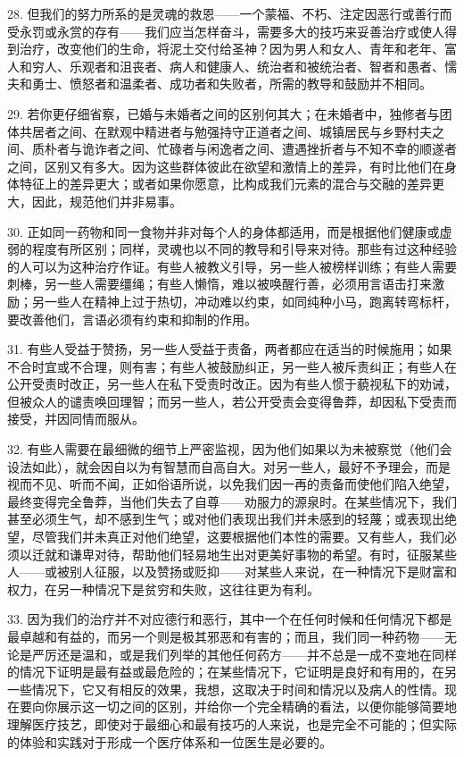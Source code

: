 28. 但我们的努力所系的是灵魂的救恩——一个蒙福、不朽、注定因恶行或善行而受永罚或永赏的存有——我们应当怎样奋斗，需要多大的技巧来妥善治疗或使人得到治疗，改变他们的生命，将泥土交付给圣神？因为男人和女人、青年和老年、富人和穷人、乐观者和沮丧者、病人和健康人、统治者和被统治者、智者和愚者、懦夫和勇士、愤怒者和温柔者、成功者和失败者，所需的教导和鼓励并不相同。\par

29. 若你更仔细省察，已婚与未婚者之间的区别何其大；在未婚者中，独修者与团体共居者之间、在默观中精进者与勉强持守正道者之间、城镇居民与乡野村夫之间、质朴者与诡诈者之间、忙碌者与闲逸者之间、遭遇挫折者与不知不幸的顺遂者之间，区别又有多大。因为这些群体彼此在欲望和激情上的差异，有时比他们在身体特征上的差异更大；或者如果你愿意，比构成我们元素的混合与交融的差异更大，因此，规范他们并非易事。\par

30. 正如同一药物和同一食物并非对每个人的身体都适用，而是根据他们健康或虚弱的程度有所区别；同样，灵魂也以不同的教导和引导来对待。那些有过这种经验的人可以为这种治疗作证。有些人被教义引导，另一些人被榜样训练；有些人需要刺棒，另一些人需要缰绳；有些人懒惰，难以被唤醒行善，必须用言语击打来激励；另一些人在精神上过于热切，冲动难以约束，如同纯种小马，跑离转弯标杆，要改善他们，言语必须有约束和抑制的作用。\par

31. 有些人受益于赞扬，另一些人受益于责备，两者都应在适当的时候施用；如果不合时宜或不合理，则有害；有些人被鼓励纠正，另一些人被斥责纠正；有些人在公开受责时改正，另一些人在私下受责时改正。因为有些人惯于藐视私下的劝诫，但被众人的谴责唤回理智；而另一些人，若公开受责会变得鲁莽，却因私下受责而接受，并因同情而服从。\par

32. 有些人需要在最细微的细节上严密监视，因为他们如果以为未被察觉（他们会设法如此），就会因自以为有智慧而自高自大。对另一些人，最好不予理会，而是视而不见、听而不闻，正如俗语所说，以免我们因一再的责备而使他们陷入绝望，最终变得完全鲁莽，当他们失去了自尊——劝服力的源泉时。在某些情况下，我们甚至必须生气，却不感到生气；或对他们表现出我们并未感到的轻蔑；或表现出绝望，尽管我们并未真正对他们绝望，这要根据他们本性的需要。又有些人，我们必须以迁就和谦卑对待，帮助他们轻易地生出对更美好事物的希望。有时，征服某些人——或被别人征服，以及赞扬或贬抑——对某些人来说，在一种情况下是财富和权力，在另一种情况下是贫穷和失败，这往往更为有利。\par

33. 因为我们的治疗并不对应德行和恶行，其中一个在任何时候和任何情况下都是最卓越和有益的，而另一个则是极其邪恶和有害的；而且，我们同一种药物——无论是严厉还是温和，或是我们列举的其他任何药方——并不总是一成不变地在同样的情况下证明是最有益或最危险的；在某些情况下，它证明是良好和有用的，在另一些情况下，它又有相反的效果，我想，这取决于时间和情况以及病人的性情。现在要向你展示这一切之间的区别，并给你一个完全精确的看法，以便你能够简要地理解医疗技艺，即使对于最细心和最有技巧的人来说，也是完全不可能的；但实际的体验和实践对于形成一个医疗体系和一位医生是必要的。\par

